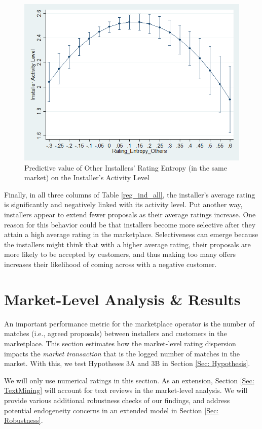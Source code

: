 \documentclass[msom,blindrev]{informs3}
\begin{document}
\begin{figure}
	\centering
	\includegraphics[width=0.7\linewidth]{marginsplot_entothers.png}
	\caption{Predictive value of Other Installers' Rating Entropy (in the same market) on the Installer's Activity Level}
	\label{fig: marginsplot_ind_ent_others}
\end{figure}





Finally, in all three columns of Table \ref{reg_ind_all}, the installer's average rating is significantly and negatively linked with its activity level. Put another way, installers appear to extend fewer proposals as their average ratings increase. One reason for this behavior could be that  installers become more selective after they attain a high average rating in the marketplace. Selectiveness can emerge because the installers might think that with a higher average rating, their proposals are more likely to be accepted by customers, and thus making too many offers increases their likelihood of coming across with a negative customer.

\section{Market-Level Analysis \& Results} \label{Sec: Market-level}

An important performance metric for the marketplace operator is the number of matches (i.e., agreed proposals) between installers and customers in the marketplace. This section estimates how the market-level rating dispersion impacts the \emph{market transaction} that is the logged number of matches in the market. With this, we test Hypotheses 3A and 3B in Section \ref{Sec: Hypothesis}.

We will only use numerical ratings in this section. As an extension, Section \ref{Sec: TextMining} will account for text reviews in the market-level analysis. We will provide various additional robustness checks of our findings, and address potential endogeneity concerns in an extended model in Section \ref{Sec: Robustness}.
\end{document}
